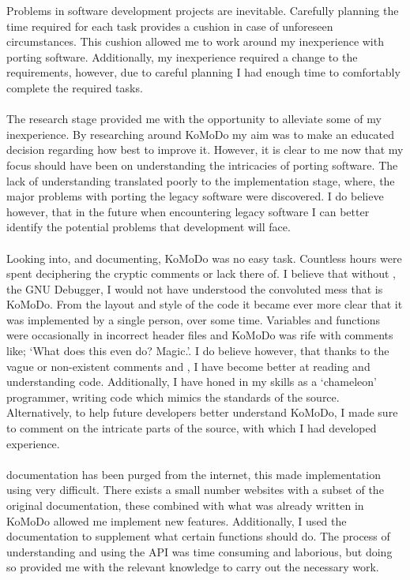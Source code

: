 Problems in software development projects are inevitable. Carefully planning the time required for each task provides a cushion in case of unforeseen circumstances. This cushion allowed me to work around my inexperience with porting software. Additionally, my inexperience required a change to the requirements, however, due to careful planning I had enough time to comfortably complete the required tasks.\\\\
%
The research stage provided me with the opportunity to alleviate some of my inexperience. By researching around KoMoDo my aim was to make an educated decision regarding how best to improve it. However, it is clear to me now that my focus should have been on understanding the intricacies of porting software. The lack of understanding translated poorly to the implementation stage, where, the major problems with porting the legacy software were discovered. I do believe however, that in the future when encountering legacy software I can better identify the potential problems that development will face.\\\\
%
Looking into, and documenting, KoMoDo was no easy task. Countless hours were spent deciphering the cryptic comments or lack there of. I believe that without , the GNU Debugger, I would not have understood the convoluted mess that is KoMoDo. From the layout and style of the code it became ever more clear that it was implemented by a single person, over some time. Variables and functions were occasionally in incorrect header files and KoMoDo was rife with comments like; `What does this even do? Magic.'. I do believe however, that thanks to the vague or non-existent comments and , I have become better at reading and understanding code. Additionally, I have honed in my skills as a `chameleon' programmer, writing code which mimics the standards of the source. Alternatively, to help future developers better understand KoMoDo, I made sure to comment on the intricate parts of the source, with which I had developed experience.\\\\
%
 documentation has been purged from the internet, this made implementation using  very difficult. There exists a small number websites with a subset of the original documentation, these combined with what was already written in KoMoDo allowed me implement new features. Additionally, I used the  documentation to supplement what certain functions should do. The process of understanding and using the  API was time consuming and laborious, but doing so provided me with the relevant knowledge to carry out the necessary work.\\\\
